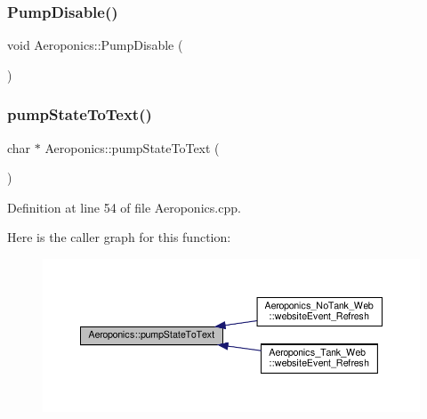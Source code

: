 \subsubsection{\texorpdfstring{Pump\+Disable()}{PumpDisable()}\hspace{0.1cm}{\footnotesize\ttfamily [2/2]}}
{\footnotesize\ttfamily void Aeroponics\+::\+Pump\+Disable (\begin{DoxyParamCaption}{ }\end{DoxyParamCaption})\hspace{0.3cm}{\ttfamily [protected]}}

\mbox{\label{class_aeroponics_acdb382c7077f71d198ceaf6c4b8ed664}} 
\subsubsection{\texorpdfstring{pump\+State\+To\+Text()}{pumpStateToText()}\hspace{0.1cm}{\footnotesize\ttfamily [1/2]}}
{\footnotesize\ttfamily char $\ast$ Aeroponics\+::pump\+State\+To\+Text (\begin{DoxyParamCaption}{ }\end{DoxyParamCaption})\hspace{0.3cm}{\ttfamily [protected]}}



Definition at line 54 of file Aeroponics.\+cpp.

Here is the caller graph for this function\+:
\nopagebreak
\begin{figure}[H]
\begin{center}
\leavevmode
\includegraphics[width=350pt]{class_aeroponics_acdb382c7077f71d198ceaf6c4b8ed664_icgraph}
\end{center}
\end{figure}
\mbox{\label{class_aeroponics_ae20bf74b4eaa0651f1253dafab201b3b}} 
